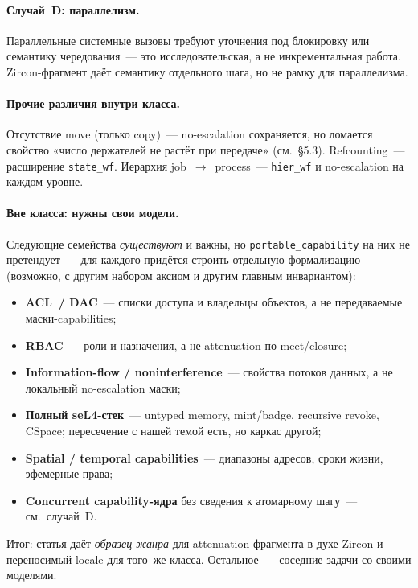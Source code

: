 \documentclass[11pt,a4paper]{article}
\begin{document}
\paragraph{Случай~D: параллелизм.}
Параллельные системные вызовы требуют уточнения под блокировку или
семантику чередования~--- это исследовательская, а не инкрементальная
работа. Zircon-фрагмент даёт семантику отдельного шага, но не рамку
для параллелизма.

\paragraph{Прочие различия внутри класса.}
Отсутствие move (только copy)~--- no-escalation сохраняется, но ломается
свойство «число держателей не растёт при передаче» (см.~§5.3).
Refcounting~--- расширение \texttt{state\_wf}. Иерархия
job~$\to$~process~--- \texttt{hier\_wf} и no-escalation на каждом уровне.

\paragraph{Вне класса: нужны свои модели.}
Следующие семейства \emph{существуют} и важны, но
\texttt{portable\_capability} на них не претендует~--- для каждого
придётся строить отдельную формализацию (возможно, с другим набором
аксиом и другим главным инвариантом):
\begin{itemize}[leftmargin=1.4em]
	\item \textbf{ACL~/ DAC}~--- списки доступа и владельцы объектов, а не
	      передаваемые маски-capabilities;
	\item \textbf{RBAC}~--- роли и назначения, а не attenuation по
	      meet/closure;
	\item \textbf{Information-flow / noninterference}~--- свойства потоков
	      данных, а не локальный no-escalation маски;
	\item \textbf{Полный seL4-стек}~--- untyped memory, mint/badge,
	      recursive revoke, CSpace; пересечение с нашей темой есть, но
	      каркас другой;
	\item \textbf{Spatial / temporal capabilities}~--- диапазоны адресов,
	      сроки жизни, эфемерные права;
	\item \textbf{Concurrent capability-ядра} без сведения к атомарному
	      шагу~--- см.~случай~D.
\end{itemize}
Итог: статья даёт \emph{образец жанра} для attenuation-фрагмента в духе
Zircon и переносимый locale для того~же класса. Остальное~--- соседние
задачи со своими моделями.
\end{document}
